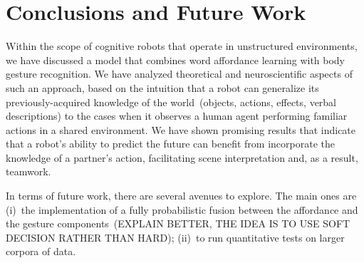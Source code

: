 
\section{Conclusions and Future Work}

Within the scope of cognitive robots that operate in unstructured environments, we have discussed a model that combines word affordance learning with body gesture recognition. We have analyzed theoretical and neuroscientific aspects of such an approach, based on the intuition that a robot can generalize its previously-acquired knowledge of the world~(objects, actions, effects, verbal descriptions) to the cases when it observes a human agent performing familiar actions in a shared \hr{} environment. We have shown promising results that indicate that a robot's ability to predict the future can benefit from incorporate the knowledge of a partner's action, facilitating scene interpretation and, as a result, teamwork.

In terms of future work, there are several avenues to explore. The main ones are (i)~the implementation of a fully probabilistic fusion between the affordance and the gesture components~(EXPLAIN BETTER, THE IDEA IS TO USE SOFT DECISION RATHER THAN HARD); (ii)~to run quantitative tests on larger corpora of \hr{} data.
